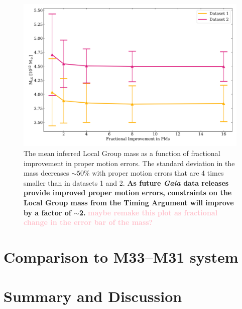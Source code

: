 \documentclass[twocolumn]{aastex631}
\newcommand{\kc}[1]{\textcolor{pink}{\textbf{#1}} }
\begin{document}
\begin{figure}[htb]
    \centering
    \includegraphics[width=\columnwidth]{analyze-runs-MvsPM.png}
    \caption{\label{fig:mvspm} The mean inferred Local Group mass as a function of fractional improvement in proper motion errors. The standard deviation in the mass decreases $\sim 50\%$ with proper motion errors that are 4 times smaller than in datasets 1 and 2. \textbf{As future \textit{Gaia} data releases provide improved proper motion errors, constraints on the Local Group mass from the Timing Argument will improve by a factor of $\sim$2.} \kc{maybe remake this plot as fractional change in the error bar of the mass?}
    }
\end{figure}


\section{Comparison to M33--M31 system}

\section{Summary and Discussion}
\label{sec:discussion}




{}

\end{document}
